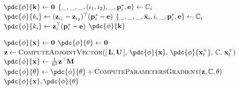 \begin{algorithm}[H]
\caption{Gradient of the loss with respect to spring stiffnesses.}
\label{alg:PD_mass_spring_grad_stiffness}
\begin{algorithmic}[1]
\addtolength{\itemsep}{0.5ex}
    \State $\pdc{\phi}{\mathbf{k}} \gets \zero$
            \State $\{\_, \_, \_, (i_1, i_2), \_, \mathbf{p}_i^*, \mathbf{e}\} \gets \mathbb{C}_i$
            \State $\pdc{\phi}{k_i} \gets (\z_{i_1} - \z_{i_2})^\top(\p_i^* - \e)$
            \State $\{\_, \_, \_, \bar{\mathbf{x}}_i, i, \_, \mathbf{p}_i^*, \mathbf{e}\} \gets \mathbb{C}_i$
            \State $\pdc{\phi}{k_i} \gets \z_i^\top(\p_i^* - \e)$
        \EndIf
    \EndFor
    \State \Return $\pdc{\phi}{\mathbf{k}}$
\EndFunction
\end{algorithmic}
\end{algorithm}

\begin{algorithm}[H]
\caption{Full backward pass through PD simulation.}
\label{alg:PD_mass_spring_backward_full}
\begin{algorithmic}[1]
\addtolength{\itemsep}{0.5ex}
    \State $\pdc{\phi}{\x} \gets \zero$
    \State $\pdc{\phi}{\theta} \gets \zero$
        \State $\z \gets \textsc{ComputeAdjointVector}([\,\LL,\mathbf{U}\,],\, \pdc{\phi}{\x},\, \pdc{\phi}{\x^+_t},\, \mathbb{C},\, \x^+_t)$
        \State $\pdc{\phi}{\x} \gets \frac{1}{h^2}\z^\top\M$
        \State $\pdc{\phi}{\theta} \gets \pdc{\phi}{\theta} + \textsc{ComputeParametersGradient}(\z, \mathbb{C}, \theta)$
    \EndFor
    \State \Return $\pdc{\phi}{\x}, \pdc{\phi}{\theta}$
\EndFunction
\end{algorithmic}
\end{algorithm}

\newpage


